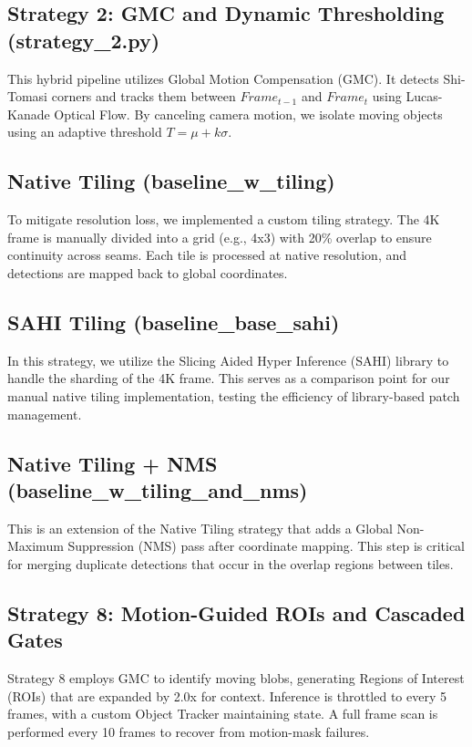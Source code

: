\documentclass{article}
\begin{document}
\subsection{Strategy 2: GMC and Dynamic Thresholding (strategy\_2.py)}
This hybrid pipeline utilizes Global Motion Compensation (GMC). It detects Shi-Tomasi
corners and tracks them
between $Frame_{t-1}$ and $Frame_t$ using Lucas-Kanade Optical Flow. By canceling camera
motion, we isolate
moving objects using an adaptive threshold $T = \mu + k\sigma$.

\subsection{Native Tiling (baseline\_w\_tiling)}
To mitigate resolution loss, we implemented a custom tiling strategy. The 4K frame is
manually divided into a
grid (e.g., 4x3) with 20\% overlap to ensure continuity across seams. Each tile is
processed at native
resolution, and detections are mapped back to global coordinates.

\subsection{SAHI Tiling (baseline\_base\_sahi)}
In this strategy, we utilize the Slicing Aided Hyper Inference (SAHI) library to handle
the sharding of the
4K frame. This serves as a comparison point for our manual native tiling implementation, testing the
efficiency of library-based patch management.

\subsection{Native Tiling + NMS (baseline\_w\_tiling\_and\_nms)}
This is an extension of the Native Tiling strategy that adds a Global Non-Maximum
Suppression (NMS) pass
after coordinate mapping. This step is critical for merging duplicate detections that
occur in the overlap
regions between tiles.

\subsection{Strategy 8: Motion-Guided ROIs and Cascaded Gates}
Strategy 8 employs GMC to identify moving blobs, generating Regions of Interest (ROIs)
that are expanded by
2.0x for context. Inference is throttled to every 5 frames, with a custom Object Tracker
maintaining state. A
full frame scan is performed every 10 frames to recover from motion-mask failures.
\end{document}
